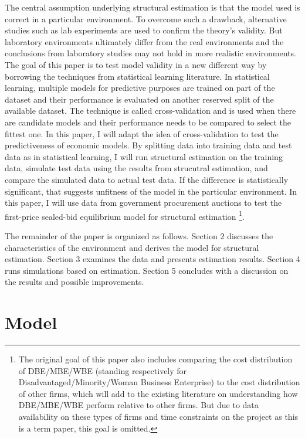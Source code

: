 \documentclass[11pt]{article}
\begin{document}
The central assumption underlying structural estimation is that the model used 
is correct in a particular environment. To overcome such a drawback, alternative 
studies such as lab experiments are used to confirm the theory's validity. But 
laboratory environments ultimately differ from the real environments and 
the conclusions from laboratory studies may not hold in more realistic environments. 
The goal of this paper is to test model validity in a new different way by 
borrowing the techniques from statistical learning literature. In statistical 
learning, multiple models for predictive purposes are trained on part of the dataset 
and their performance is evaluated on another reserved split of 
the available dataset. The technique is called cross-validation 
and is used when there are candidate models and their performance needs to 
be compared to select the fittest one. In this paper, I will adapt the idea 
of cross-validation to test the predictiveness of economic models. By splitting 
data into training data and test data as in statistical learning, I will 
run structural estimation on the training data, simulate test data using the 
results from strucutral estimation, and compare the simulated data to actual 
test data. If the difference is statistically significant, that suggests 
unfitness of the model in the particular environment. 
In this paper, I will use data from government procurement auctions to test 
the first-price sealed-bid equilibrium model \cite{RileySamuelson1981} 
for structural estimation
\footnote{The original goal of this paper also includes comparing the cost 
distribution of DBE/MBE/WBE (standing respectively for Disadvantaged/Minority/Woman
Business Enterprise) to the cost distribution of other firms, which will add 
to the existing literature on understanding how DBE/MBE/WBE perform relative 
to other firms. But due to data availability on these types of firms 
and time constraints on the project as this is a 
term paper, this goal is omitted. }.

The remainder of the paper is organized as follows. Section 2 discusses the 
characteristics of the environment and derives the model for structural 
estimation. Section 3 examines the data and presents estimation results. 
Section 4 runs simulations based on estimation. Section 5 concludes with 
a discussion on the results and possible improvements. 

\section{Model}
\end{document}
